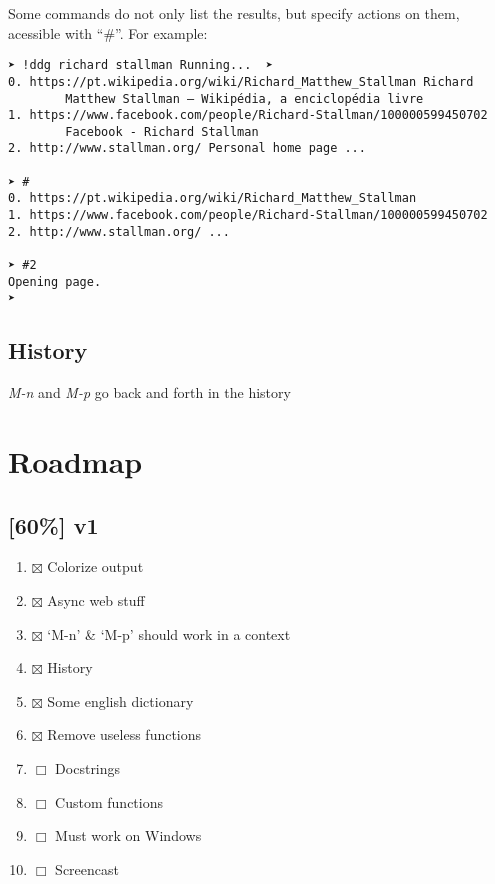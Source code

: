 \documentclass[11pt]{article}
\begin{document}
   Some commands do not only list the results, but specify actions on
   them, acessible with ``\#''. For example:


\begin{verbatim}
➤ !ddg richard stallman Running...  ➤
0. https://pt.wikipedia.org/wiki/Richard_Matthew_Stallman Richard
        Matthew Stallman – Wikipédia, a enciclopédia livre
1. https://www.facebook.com/people/Richard-Stallman/100000599450702
        Facebook - Richard Stallman
2. http://www.stallman.org/ Personal home page ...

➤ #
0. https://pt.wikipedia.org/wiki/Richard_Matthew_Stallman
1. https://www.facebook.com/people/Richard-Stallman/100000599450702
2. http://www.stallman.org/ ...

➤ #2
Opening page.
➤
\end{verbatim}



\subsection{History}
\label{sec-2.4}


   \emph{M-n} and \emph{M-p} go back and forth in the history


\section{Roadmap}
\label{sec-3}

\subsection{[60\%] v1}
\label{sec-3.1}

\begin{enumerate}
\item $\boxtimes$ Colorize output
\item $\boxtimes$ Async web stuff
\item $\boxtimes$ `M-n' \& `M-p' should work in a context
\item $\boxtimes$ History
\item $\boxtimes$ Some english dictionary
\item $\boxtimes$ Remove useless functions
\item $\Box$ Docstrings
\item $\Box$ Custom functions
\item $\Box$ Must work on Windows
\item $\Box$ Screencast
\end{enumerate}
\end{document}
